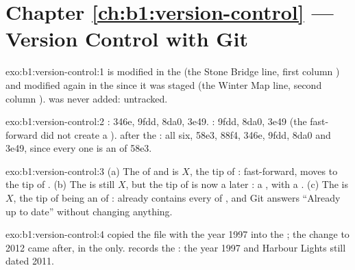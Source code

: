 \section*{Chapter \ref{ch:b1:version-control} --- Version Control with Git}

\begin{solution}{exo:b1:version-control:1}
 is modified in the  (the Stone Bridge line, first column ) and modified again in
the  since it was staged (the Winter Map line, second column ).  was never added:
untracked.
\end{solution}

\begin{solution}{exo:b1:version-control:2}
: 346e, 9fdd, 8da0, 3e49. : 9fdd, 8da0, 3e49 (the fast-forward did not create a ).
 after the : all six, 58e3, 88f4, 346e, 9fdd, 8da0 and 3e49, since every one is an  of 58e3.
\end{solution}

\begin{solution}{exo:b1:version-control:3}
(a) The  of  and  is $X$, the tip of : fast-forward,  moves to the tip
of . (b) The  is still $X$, but the tip of  is now a later : a , with a
 . (c) The  is $X$, the tip of  being an  of :  already
contains every  of , and Git answers ``Already up to date'' without changing anything.
\end{solution}

\begin{solution}{exo:b1:version-control:4}
 copied the file with the year 1997 into the ; the change to 2012 came after, in the  only.  records the : the year 1997 and Harbour Lights still dated 2011.
\end{solution}

